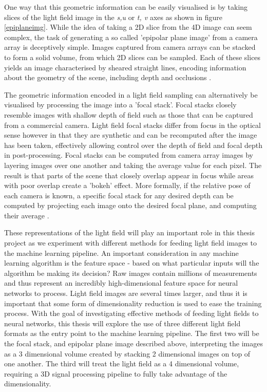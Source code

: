 \documentclass[openany]{book}
\begin{document}
One way that this geometric information can be easily visualised is by taking slices of the light field image in the \textit{s,u} or \textit{t, v} axes as shown in figure \ref{epiplaneimg}. While the idea of taking a 2D slice from the 4D image can seem complex, the task of generating a so called 'epipolar plane image' from a camera array is deceptively simple. Images captured from camera arrays can be stacked to form a solid volume, from which 2D slices can be sampled. Each of these slices yields an image characterised by sheared straight lines, encoding information about the geometry of the scene, including depth and occlusions \cite{bolles1987epiplane}. 

The geometric information encoded in a light field sampling can alternatively be visualised by processing the image into a 'focal stack'. Focal stacks closely resemble images with shallow depth of field such as those that can be captured from a commercial camera. Light field focal stacks differ from focus in the optical sense however in that they are synthetic and can be recomputed after the image has been taken, effectively allowing control over the depth of field and focal depth in post-processing. Focal stacks can be computed from camera array images by layering images over one another and taking the average value for each pixel. The result is that parts of the scene that closely overlap appear in focus while areas with poor overlap create a 'bokeh' effect. More formally, if the relative pose of each camera is known, a specific focal stack for any desired depth can be computed by projecting each image onto the desired focal plane, and computing their average \cite{vaish2004parallax}.

These representations of the light field will play an important role in this thesis project as we experiment with different methods for feeding light field images to the machine learning pipeline. An important consideration in any machine learning algorithm is the feature space - based on what particular inputs will the algorithm be making its decision? Raw images contain millions of measurements and thus represent an incredibly high-dimensional feature space for neural networks to process. Light field images are several times larger, and thus it is important that some form of dimensionality reduction is used to ease the training process. With the goal of investigating effective methods of feeding light fields to neural networks, this thesis will explore the use of three different light field formats as the entry point to the machine learning pipeline. The first two will be the focal stack, and epipolar plane image described above, interpreting the images as a 3 dimensional volume created by stacking 2 dimensional images on top of one another. The third will treat the light field as a 4 dimensional volume, requiring a 3D signal processing pipeline to fully take advantage of the dimensionality.
\end{document}
